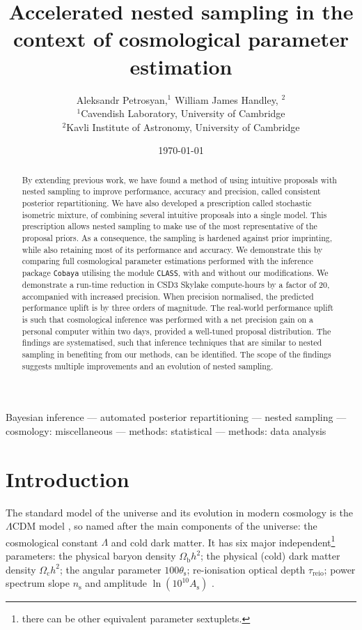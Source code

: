 \documentclass[usenatbib]{mnras}
\author[A. Petrosyan and W. Handley]{
  Aleksandr Petrosyan,$^{1}$
  William James Handley, $^{2}$
  \\
  $^{1}$Cavendish Laboratory, University of Cambridge\\
  $^{2}$Kavli Institute of Astronomy, University of Cambridge
}
\date{\today}
\title[Accelerated Nested Sampling]{Accelerated nested sampling in the context of cosmological parameter estimation}
\begin{document}
\newpage
\thispagestyle{plain} %

\maketitle
\begin{abstract}
  By extending previous work, we have found a method of using
  intuitive proposals with nested sampling to improve performance,
  accuracy and precision, called consistent posterior
  repartitioning. We have also developed a prescription called
  stochastic isometric mixture, of combining several intuitive
  proposals into a single model. This prescription allows nested
  sampling to make use of the most representative of the proposal
  priors. As a consequence, the sampling is hardened against prior
  imprinting, while also retaining most of its performance and
  accuracy. We demonstrate this by comparing full cosmological
  parameter estimations performed with the inference package
  \texttt{Cobaya} utilising the module \texttt{CLASS}, with and
  without our modifications. We demonstrate a run-time reduction in
  CSD3 Skylake compute-hours by a factor of \(20\), accompanied with
  increased precision. When precision normalised, the predicted
  performance uplift is by three orders of magnitude.  The real-world
  performance uplift is such that cosmological inference was performed
  with a net precision gain on a personal computer within two days,
  provided a well-tuned proposal distribution. The findings are
  systematised, such that inference techniques that are similar to
  nested sampling in benefiting from our methods, can be
  identified. The scope of the findings suggests multiple improvements
  and an evolution of nested sampling.
\end{abstract}

\begin{keywords}
Bayesian inference --- automated posterior repartitioning --- nested sampling --- cosmology: miscellaneous --- methods: statistical --- methods: data analysis
\end{keywords}

\section{Introduction}\label{sec:org14413d7}

The standard model of the universe and its evolution in modern
cosmology is the \(\Lambda\)CDM model \citep{Condon2018}, so named
after the main components of the universe: the cosmological constant
\(\Lambda\) and cold dark matter. It has six major
independent\footnote{there can be other equivalent parameter
  sextuplets. } parameters: the physical baryon density
\(\Omega_\mathrm{b}h^{2}\); the physical (cold) dark matter density
\(\Omega_\mathrm{c}h^{2}\); the angular parameter
\(100\theta_\mathrm{s}\); re-ionisation optical depth
\(\tau_\text{reio}\); power spectrum slope \(n_\mathrm{s}\) and
amplitude \(\ln (10^{10}A_\mathrm{s})\) \citep{Cosmology}.
\end{document}
